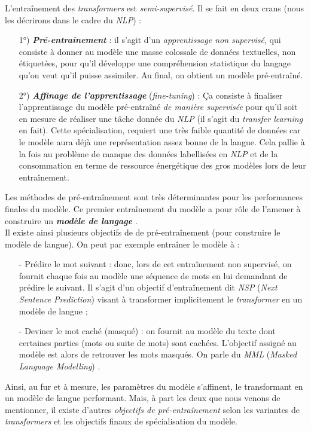 L'entraînement des \textit{transformers} est \textit{semi-supervisé}. Il se fait en deux crans (nous les décrirons dans le cadre du \textit{NLP}) :
\begin{itemize}
\item[1°)] \textit{\textbf{Pré-entraînement}} : il s'agit d'un \textit{apprentissage non supervisé}, qui consiste à donner au modèle une masse colossale de données textuelles, non étiquetées, pour qu'il développe une compréhension statistique du langage qu'on veut qu'il puisse assimiler. Au final, on obtient un modèle pré-entraîné.
\item[2°)] \textit{\textbf{Affinage de l'apprentissage}} (\textit{fine-tuning}) : Ça consiste à finaliser l'apprentissage du modèle pré-entraîné \textit{de manière supervisée} pour qu'il soit en mesure de réaliser une tâche donnée du \textit{NLP} (il s'agit du \textit{transfer learning} en fait). Cette spécialisation, requiert une très faible quantité de données car le modèle aura déjà une représentation assez bonne de la langue. Cela pallie à la fois au problème de manque des données labellisées en \textit{NLP} et de la consommation en terme de ressource énergétique des gros modèles lors de leur entraînement. 
\end{itemize}
Les méthodes de pré-entraînement sont très déterminantes pour les performances finales du modèle. Ce premier entraînement du modèle a pour rôle de l'amener à construire un \textit{\textbf{modèle de langage}} \cite{BART}.\\
Il existe ainsi plusieurs objectifs de de pré-entraînement (pour construire le modèle de langue). On peut par exemple entraîner le modèle à :
\begin{itemize}
\item[-] Prédire le mot suivant : donc, lors de cet entraînement non supervisé, on fournit chaque fois au modèle une séquence de mots en lui demandant de prédire le suivant. Il s'agit d'un objectif d'entraînement dit \textit{NSP} (\textit{Next Sentence Prediction}) visant à transformer implicitement le \textit{transformer} en un modèle de langue  \cite{BERT_devlin2018bert};
\item[-] Deviner le mot caché (masqué) : on fournit au modèle du texte dont certaines parties (mots ou suite de mots) sont cachées. L'objectif assigné au modèle est alors de retrouver les mots masqués. On parle du \textit{MML} (\textit{Masked Language Modelling}) \cite{BERT_devlin2018bert}.
\end{itemize}
Ainsi, au fur et à mesure, les paramètres du modèle s'affinent, le transformant en un modèle de langue performant. Mais, à part les deux que nous venons de mentionner, il existe d'autres \textit{objectifs de pré-entraînement} \cite{BART,PEGASUSzhang2020pegasus} selon les variantes de \textit{transformers} et les objectifs finaux de spécialisation du modèle.\\

